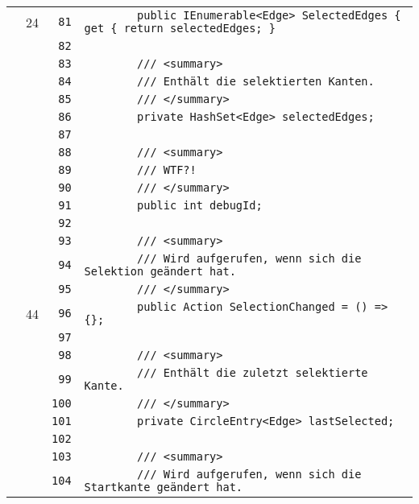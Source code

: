 \documentclass[a4paper,10pt]{article}
\begin{document}
\begin{longtable}[l]{lrrl}
\cellcolor{green} & 24 & \verb~81~ & \verb~        public IEnumerable<Edge> SelectedEdges { get { return selectedEdges; }~\\
\cellcolor{gray} &  & \verb~82~ & \verb~~\\
\cellcolor{gray} &  & \verb~83~ & \verb~        /// <summary>~\\
\cellcolor{gray} &  & \verb~84~ & \verb~        /// Enthält die selektierten Kanten.~\\
\cellcolor{gray} &  & \verb~85~ & \verb~        /// </summary>~\\
\cellcolor{gray} &  & \verb~86~ & \verb~        private HashSet<Edge> selectedEdges;~\\
\cellcolor{gray} &  & \verb~87~ & \verb~~\\
\cellcolor{gray} &  & \verb~88~ & \verb~        /// <summary>~\\
\cellcolor{gray} &  & \verb~89~ & \verb~        /// WTF?!~\\
\cellcolor{gray} &  & \verb~90~ & \verb~        /// </summary>~\\
\cellcolor{gray} &  & \verb~91~ & \verb~        public int debugId;~\\
\cellcolor{gray} &  & \verb~92~ & \verb~~\\
\cellcolor{gray} &  & \verb~93~ & \verb~        /// <summary>~\\
\cellcolor{gray} &  & \verb~94~ & \verb~        /// Wird aufgerufen, wenn sich die Selektion geändert hat.~\\
\cellcolor{gray} &  & \verb~95~ & \verb~        /// </summary>~\\
\cellcolor{green} & 44 & \verb~96~ & \verb~        public Action SelectionChanged = () => {};~\\
\cellcolor{gray} &  & \verb~97~ & \verb~~\\
\cellcolor{gray} &  & \verb~98~ & \verb~        /// <summary>~\\
\cellcolor{gray} &  & \verb~99~ & \verb~        /// Enthält die zuletzt selektierte Kante.~\\
\cellcolor{gray} &  & \verb~100~ & \verb~        /// </summary>~\\
\cellcolor{gray} &  & \verb~101~ & \verb~        private CircleEntry<Edge> lastSelected;~\\
\cellcolor{gray} &  & \verb~102~ & \verb~~\\
\cellcolor{gray} &  & \verb~103~ & \verb~        /// <summary>~\\
\cellcolor{gray} &  & \verb~104~ & \verb~        /// Wird aufgerufen, wenn sich die Startkante geändert hat.~\\

\end{longtable}
\end{document}

